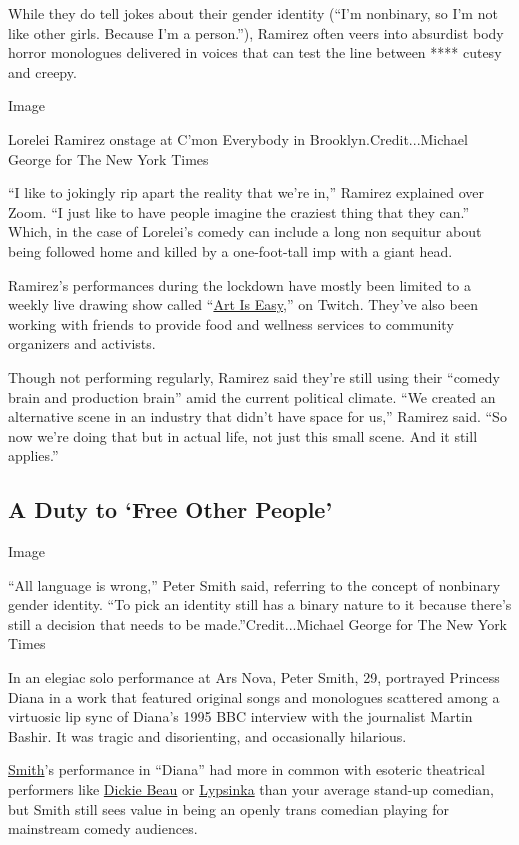 While they do tell jokes about their gender identity (``I'm nonbinary,
so I'm not like other girls. Because I'm a person.''), Ramirez often
veers into absurdist body horror monologues delivered in voices that can
test the line between **** cutesy and creepy.

Image

Lorelei Ramirez onstage at C'mon Everybody in Brooklyn.Credit...Michael
George for The New York Times

``I like to jokingly rip apart the reality that we're in,'' Ramirez
explained over Zoom. ``I just like to have people imagine the craziest
thing that they can.'' Which, in the case of Lorelei's comedy can
include a long non sequitur about being followed home and killed by a
one-foot-tall imp with a giant head.

Ramirez's performances during the lockdown have mostly been limited to a
weekly live drawing show called
``\href{https://www.twitch.tv/lramirez8095}{Art Is Easy},'' on Twitch.
They've also been working with friends to provide food and wellness
services to community organizers and activists.

Though not performing regularly, Ramirez said they're still using their
``comedy brain and production brain'' amid the current political
climate. ``We created an alternative scene in an industry that didn't
have space for us,'' Ramirez said. ``So now we're doing that but in
actual life, not just this small scene. And it still applies.''

\hypertarget{a-duty-to-free-other-people}{%
\subsection{A Duty to `Free Other
People'}\label{a-duty-to-free-other-people}}

Image

``All language is wrong,'' Peter Smith said, referring to the concept of
nonbinary gender identity. ``To pick an identity still has a binary
nature to it because there's still a decision that needs to be
made.''Credit...Michael George for The New York Times

In an elegiac solo performance at Ars Nova, Peter Smith, 29, portrayed
Princess Diana in a work that featured original songs and monologues
scattered among a virtuosic lip sync of Diana's 1995 BBC interview with
the journalist Martin Bashir. It was tragic and disorienting, and
occasionally hilarious.

\href{http://ptrsmth.com/}{Smith}'s performance in ``Diana'' had more in
common with esoteric theatrical performers like
\href{http://dickiebeau.com/}{Dickie Beau} or
\href{https://www.lypsinka.com/}{Lypsinka} than your average stand-up
comedian, but Smith still sees value in being an openly trans comedian
playing for mainstream comedy audiences.

